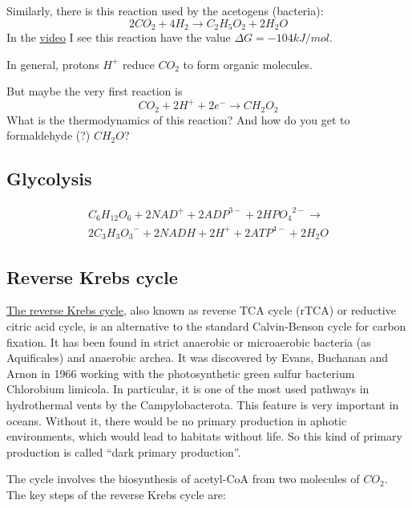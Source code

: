 \documentclass{article}
\begin{document}
Similarly, there is this reaction used by the acetogens (bacteria):
\[
    2CO_2 + 4H_2 \rightarrow C_2H_5O_2 + 2H_2O
\]
In the \href{https://www.youtube.com/watch?v=FWVAyAnrhXU}{video} I see this reaction have
the value $\Delta G = -104 kJ/mol$.

In general, protons $H^+$ reduce $CO_2$ to form organic molecules.

But maybe the very first reaction is
\[
    CO_2 + 2H^+ + 2e^- \rightarrow CH_2O_2
\]
What is the thermodynamics of this reaction?
And how do you get to formaldehyde (?) $CH_2O$?

\subsection{Glycolysis}
\[
    \begin{split}
    C_6H_{12}O_6 + 2{NAD}^+ + 2{ADP}^{3-} + 2{HPO_4}^{2-} \rightarrow \\
    2{C_3H_3O_3}^- + 2NADH + 2H^+ + 2{ATP}^{4-} + 2H_2O
    \end{split}
\]

\subsection{Reverse Krebs cycle}
\href{https://en.wikipedia.org/wiki/Biological_carbon_fixation}{The reverse Krebs cycle},
also known as reverse TCA cycle (rTCA) or reductive citric acid
cycle, is an alternative to the standard Calvin-Benson cycle for carbon fixation. It has
been found in strict anaerobic or microaerobic bacteria (as Aquificales) and anaerobic
archea. It was discovered by Evans, Buchanan and Arnon in 1966 working with the
photosynthetic green sulfur bacterium Chlorobium limicola. In particular, it is one of
the most used pathways in hydrothermal vents by the Campylobacterota. This feature is
very important in oceans. Without it, there would be no primary production in aphotic
environments, which would lead to habitats without life. So this kind of primary
production is called ``dark primary production''.

The cycle involves the biosynthesis of acetyl-CoA from two molecules of $CO_2$. The key
steps of the reverse Krebs cycle are:
\end{document}
